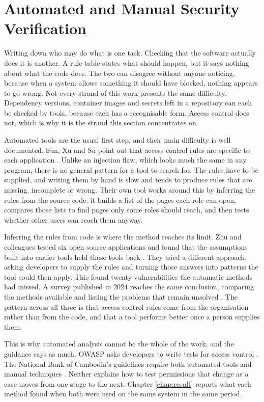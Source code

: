\section{Automated and Manual Security Verification}
\label{sec:lr-verification}

Writing down who may do what is one task. Checking that the software actually does it is another. A rule table states what should happen, but it says nothing about what the code does. The two can disagree without anyone noticing, because when a system allows something it should have blocked, nothing appears to go wrong. Not every strand of this work presents the same difficulty. Dependency versions, container images and secrets left in a repository can each be checked by tools, because each has a recognisable form. Access control does not, which is why it is the strand this section concentrates on.

Automated tools are the usual first step, and their main difficulty is well documented. Sun, Xu and Su point out that access control rules are specific to each application \cite{sun2011}. Unlike an injection flaw, which looks much the same in any program, there is no general pattern for a tool to search for. The rules have to be supplied, and writing them by hand is slow and tends to produce rules that are missing, incomplete or wrong. Their own tool works around this by inferring the rules from the source code: it builds a list of the pages each role can open, compares those lists to find pages only some roles should reach, and then tests whether other users can reach them anyway.

Inferring the rules from code is where the method reaches its limit. Zhu and colleagues tested six open source applications and found that the assumptions built into earlier tools held those tools back \cite{zhu2015}. They tried a different approach, asking developers to supply the rules and turning those answers into patterns the tool could then apply. This found twenty vulnerabilities the automatic methods had missed. A survey published in 2024 reaches the same conclusion, comparing the methods available and listing the problems that remain unsolved \cite{anas2024}. The pattern across all three is that access control rules come from the organisation rather than from the code, and that a tool performs better once a person supplies them.

This is why automated analysis cannot be the whole of the work, and the guidance says as much. OWASP asks developers to write tests for access control \cite{owasp2021}. The National Bank of Cambodia's guidelines require both automated tools and manual techniques \cite{nbc2026}. Neither explains how to test permissions that change as a case moves from one stage to the next. Chapter \ref{chap:result} reports what each method found when both were used on the same system in the same period.
